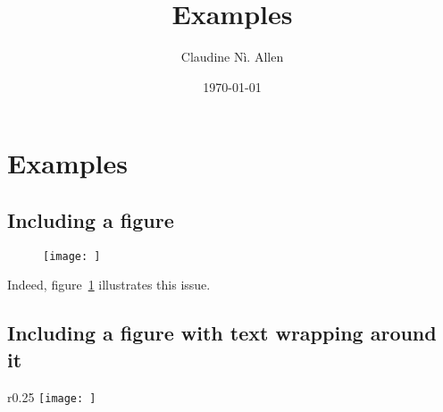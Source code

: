 \documentclass[english,french,12pt,letterpaper]{article}
\begin{document}
%
\title{Examples}
\author{Claudine Nì. Allen}
\date{\today}

\section{Examples}

\subsection{Including a figure}
\begin{figure}[h] %
    \centering
    \texttt{[image: ]} %
    \caption{}
    \label{fig:} %
\end{figure}
\lipsum[1][1] Indeed, figure~\ref{fig:} illustrates this issue.

\subsection{Including a figure with text wrapping around it} %
\lipsum[1-3]
\begin{wrapfigure}{r}{0.25\textwidth} %
    \centering
    \texttt{[image: ]} %
    \caption{}
    \label{fig:} %
\end{wrapfigure}

\end{document}
